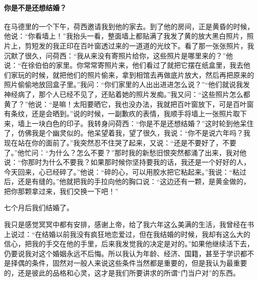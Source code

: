 \paragraph{你是不是还想结婚？}
\par 在马德里的一个下午，荷西邀请我到他的家去。到了他的房间，正是黄昏的时候，他说：“你看墙上！”我抬头一看，整面墙上都贴满了我发了黄的放大黑白照片，照片上，剪短发的我正印在百叶窗透过来的一道道的光纹下。看了那一张张照片，我沉默了很久，问荷西：“我从来没有寄照片给你，这些照片是哪里来的？”他说：“在徐伯伯的家里。你常常寄照片来，他们看过了就把它摆在纸盒里，我去他们家玩的时候，就把他们的照片偷来，拿到相馆去再做底片放大，然后再把原来的照片偷偷地放回盒子里。”我问：“你们家里的人出出进进怎么说？”“他们就说我发神经病了，那个人已经不见了，还贴着她的照片发痴。”我又问：“这些照片怎么都黄了？”他说：“是嘛！太阳要晒它，我也没办法，我就把百叶窗放下，可是百叶窗有条纹，还是会晒到。”说的时候，一副歉疚的表情，我顺手将墙上一张照片取下来，墙上一块白色的印子。我转身问荷西：“你是不是还想结婚？”这时轮到他呆住了，仿佛我是个幽灵似的。他呆望着我，望了很久，我说：“你不是说六年吗？我现在站在你的面前了。”我突然忍不住哭了起来，又说：“还是不要好了，不要了。”他忙问：“为什么？怎么不要？”那时我的新愁旧恨突然都涌了出来，我对他说：“你那时为什么不要我？如果那时候你坚持要我的话，我还是一个好好的人，今天回来，心已经碎了。”他说：“碎的心，可以用胶水把它粘起来。”我说：“粘过后，还是有缝的。”他就把我的手拉向他的胸口说：“这边还有一颗，是黄金做的，把你那颗拿过来，我们交换一下吧！”
\par 七个月后我们结婚了。
\par 我只是感觉冥冥中都有安排，感谢上帝，给了我六年这么美满的生活，我曾经在书上说过：“在结婚以前我没有疯狂地恋爱过，但在我结婚的时候，我却有这么大的信心，把我的手交在他的手里，后来我发觉我的决定是对的。”如果他继续活下去，仍要说我对这个婚姻永远不后悔。所以我认为年龄、经济、国籍，甚至于学识都不是择偶的条件，固然对一般人来说这些条件当然都是重要的，但是我认为最重要的，还是彼此的品格和心灵，这才是我们所要讲求的所谓“门当户对”的东西。
